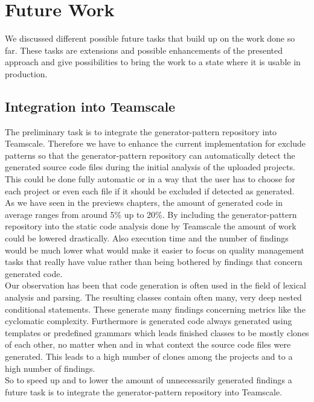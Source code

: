 
\chapter{Future Work}\label{chapter:future}
We discussed different possible future tasks that build up on the work done so far. These tasks are extensions and possible enhancements of the presented approach and give possibilities to bring the work to a state where it is usable in production.

\section{Integration into Teamscale}
The preliminary task is to integrate the generator-pattern repository into Teamscale. Therefore we have to enhance the current implementation for exclude patterns so that the generator-pattern repository can automatically detect the generated source code files during the initial analysis of the uploaded projects. This could be done fully automatic or in a way that the user has to choose for each project or even each file if it should be excluded if detected as generated.\\
As we have seen in the previews chapters, the amount of generated code in average ranges from around 5\% up to 20\%. By including the generator-pattern repository into the static code analysis done by Teamscale the amount of work could be lowered drastically. Also execution time and the number of findings would be much lower what would make it easier to focus on quality management tasks that really have value rather than being bothered by findings that concern generated code.\\
Our observation has been that code generation is often used in the field of lexical analysis and parsing. The resulting classes contain often many, very deep nested conditional statements. These generate many findings concerning metrics like the cyclomatic complexity. Furthermore is generated code always generated using templates or predefined grammars which leads finished classes to be mostly clones of each other, no matter when and in what context the source code files were generated. This leads to a high number of clones among the projects and to a high number of findings.\\
So to speed up and to lower the amount of unnecessarily generated findings a future task is to integrate the generator-pattern repository into Teamscale.

